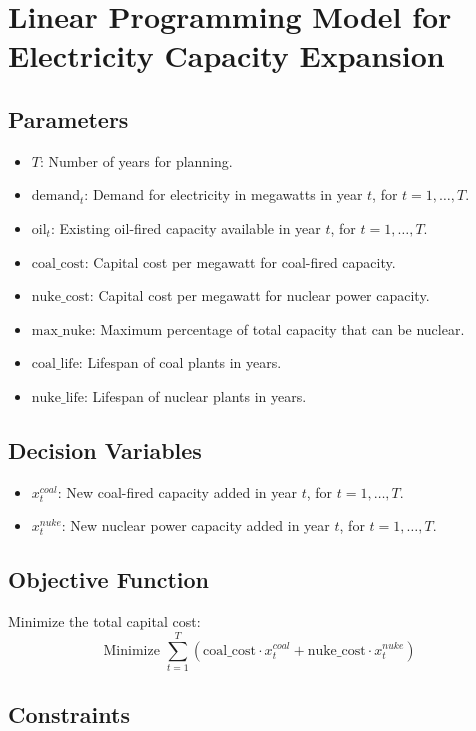 \documentclass{article}
\begin{document}
\section*{Linear Programming Model for Electricity Capacity Expansion}

\subsection*{Parameters}
\begin{itemize}
    \item $T$: Number of years for planning.
    \item $\text{demand}_t$: Demand for electricity in megawatts in year $t$, for $t = 1, \ldots, T$.
    \item $\text{oil}_t$: Existing oil-fired capacity available in year $t$, for $t = 1, \ldots, T$.
    \item $\text{coal\_cost}$: Capital cost per megawatt for coal-fired capacity.
    \item $\text{nuke\_cost}$: Capital cost per megawatt for nuclear power capacity.
    \item $\text{max\_nuke}$: Maximum percentage of total capacity that can be nuclear.
    \item $\text{coal\_life}$: Lifespan of coal plants in years.
    \item $\text{nuke\_life}$: Lifespan of nuclear plants in years.
\end{itemize}

\subsection*{Decision Variables}
\begin{itemize}
    \item $x_t^{coal}$: New coal-fired capacity added in year $t$, for $t = 1, \ldots, T$.
    \item $x_t^{nuke}$: New nuclear power capacity added in year $t$, for $t = 1, \ldots, T$.
\end{itemize}

\subsection*{Objective Function}
Minimize the total capital cost:
\[
\text{Minimize } \sum_{t=1}^{T} (\text{coal\_cost} \cdot x_t^{coal} + \text{nuke\_cost} \cdot x_t^{nuke})
\]

\subsection*{Constraints}
\end{document}
